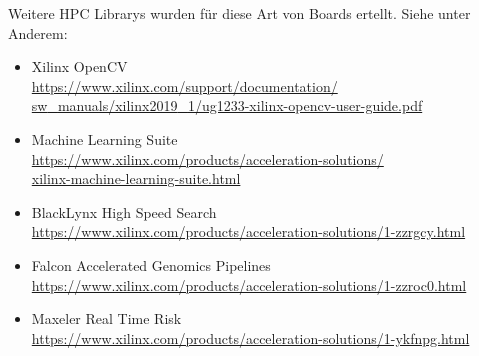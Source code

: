 		Weitere HPC Librarys wurden für diese Art von Boards ertellt. Siehe unter Anderem:
		\begin{itemize}
			\item Xilinx OpenCV \\
			\href{https://www.xilinx.com/support/documentation/sw_manuals/xilinx2019_1/ug1233-xilinx-opencv-user-guide.pdf}{https://www.xilinx.com/support/documentation/ \\ sw{\_}manuals/xilinx2019{\_}1/ug1233-xilinx-opencv-user-guide.pdf}
			
			\item Machine Learning Suite \\
			\href{https://www.xilinx.com/products/acceleration-solutions/xilinx-machine-learning-suite.html}{https://www.xilinx.com/products/acceleration-solutions/ \\ xilinx-machine-learning-suite.html}
			
			\item BlackLynx High Speed Search \\
			\url{https://www.xilinx.com/products/acceleration-solutions/1-zzrgcy.html}
			
			\item Falcon Accelerated Genomics Pipelines \\
			\url{https://www.xilinx.com/products/acceleration-solutions/1-zzroc0.html}
			
			\item Maxeler Real Time Risk \\
			\url{https://www.xilinx.com/products/acceleration-solutions/1-ykfnpg.html}
		\end{itemize}